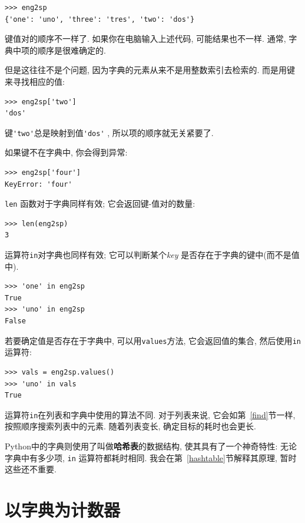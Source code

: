 \documentclass[10pt]{book}
\begin{document}
\begin{verbatim}
>>> eng2sp
{'one': 'uno', 'three': 'tres', 'two': 'dos'}
\end{verbatim}
%
键值对的顺序不一样了. 
如果你在电脑输入上述代码, 可能结果也不一样. 
通常, 字典中项的顺序是很难确定的. 

但是这往往不是个问题, 因为字典的元素从来不是用整数索引去检索的. 
而是用键来寻找相应的值:

\begin{verbatim}
>>> eng2sp['two']
'dos'
\end{verbatim}
%
键\verb"'two'"总是映射到值\verb"'dos'" , 所以项的顺序就无关紧要了. 

如果键不在字典中, 你会得到异常:

\begin{verbatim}
>>> eng2sp['four']
KeyError: 'four'
\end{verbatim}
%
 {\tt len} 函数对于字典同样有效; 它会返回键-值对的数量:

\begin{verbatim}
>>> len(eng2sp)
3
\end{verbatim}
%
运算符{\tt in}对字典也同样有效;
它可以判断某个{\em key} 是否存在于字典的键中(而不是值中). 

\begin{verbatim}
>>> 'one' in eng2sp
True
>>> 'uno' in eng2sp
False
\end{verbatim}
%
若要确定值是否存在于字典中, 可以用{\tt values}方法, 它会返回值的集合,  
然后使用{\tt in}运算符:

\begin{verbatim}
>>> vals = eng2sp.values()
>>> 'uno' in vals
True
\end{verbatim}
%
运算符{\tt in}在列表和字典中使用的算法不同. 
对于列表来说, 它会如第~\ref{find}节一样, 按照顺序搜索列表中的元素. 
随着列表变长, 确定目标的耗时也会更长. 

Python中的字典则使用了叫做{\bf 哈希表}的数据结构, 使其具有了一个神奇特性: 
无论字典中有多少项, {\tt in} 运算符都耗时相同. 
我会在第~\ref{hashtable}节解释其原理, 暂时这些还不重要. 

\section{以字典为计数器}
\label{histogram}
\end{document}
